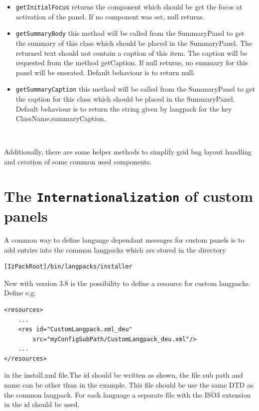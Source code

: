 \begin{itemize}
  \item \texttt{getInitialFocus} returns the component which should be get the
  focos at activation of the panel. If no component was set, null returns.\\

  \item \texttt{getSummaryBody} this method will be called from the 
  SummaryPanel to get the summary of this class which should be placed in the
  SummaryPanel. The returned text should not contain a caption of this item. 
  The caption will be requested from the method getCaption. If null returns, 
  no summary for this panel will be enerated. Default behaviour is to return 
  null.\\
  \item \texttt{getSummaryCaption} this method will be called from the 
  SummaryPanel to get the caption for this class which should be placed in the
  SummaryPanel. Default behaviour is to return the string given by langpack
  for the key ClassName.summaryCaption.\\
  

\end{itemize}\

Additionally, there are some helper methods to simplify grid bag layout handling
and creation of some common used components.

\section{The \texttt{Internationalization} of custom panels}
A common way to define language dependant messages for custom panels is to
add entries into the common langpacks which are stored in the directory
\begin{verbatim}
[IzPackRoot]/bin/langpacks/installer
\end{verbatim}
New with version 3.8 is the possibility to define a resource for custom
langpacks. Define e.g.
\begin{verbatim}
<resources>
    ...
    <res id="CustomLangpack.xml_deu" 
        src="myConfigSubPath/CustomLangpack_deu.xml"/>
    ...
</resources>
\end{verbatim}
in the install.xml file.The id should be written as shown, the file sub path
and name can be other than in the example. This file should be use the 
same DTD as the common langpack. For each language a separate file with
the ISO3 extension in the id should be used.

